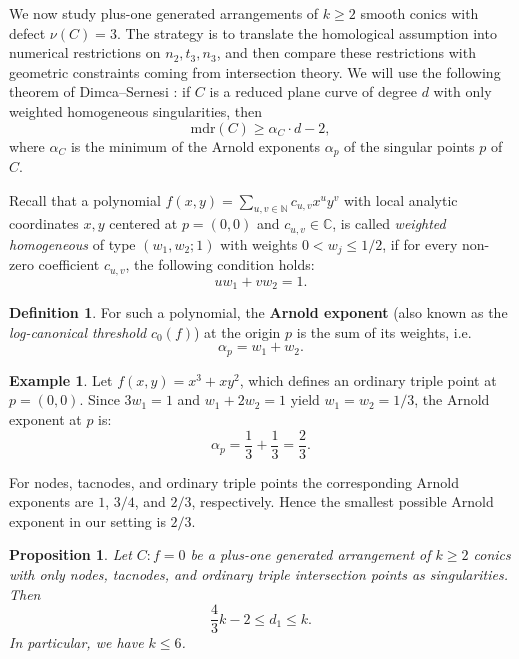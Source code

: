 \documentclass[11pt]{article}
\theoremstyle{plain}
\newtheorem{proposition}[thm]{Proposition}
\theoremstyle{definition}
\newtheorem{definition}[thm]{Definition}
\newtheorem{example}[thm]{Example}
\begin{document}
We now study plus-one generated arrangements of $k\geq2$ smooth conics with defect $\nu(C)=3$. The strategy is to translate the homological assumption into numerical restrictions on $n_2,t_3,n_3$, and then compare these restrictions with geometric constraints coming from intersection theory. 
\noindent
We will use the following theorem of Dimca--Sernesi \cite[Theorem 2.1]{Sernesi}: if $C$ is a reduced plane curve of degree $d$ with only weighted homogeneous singularities, then 
\begin{equation}\tag{$\triangle$}\label{eqtriangle}
    \text{mdr}(C)\geq\alpha_C\cdot d-2,
\end{equation}
where $\alpha_C$ is the minimum of the Arnold exponents $\alpha_p$ of the singular points $p$ of $C$. 

Recall that a polynomial $f(x,y)=\sum_{u,v\in\mathbb{N}}c_{u,v}x^uy^v$ with local analytic coordinates $x,y$ centered at $p=(0,0)$ and $c_{u,v}\in\mathbb{C}$, is called \textit{weighted homogeneous} of type $(w_1,w_2;1)$ with weights $0<w_j\leq1/2$, if for every non-zero coefficient $c_{u,v}$, the following condition holds:
$$uw_1+vw_2=1.$$

\begin{definition}
For such a polynomial, the \textbf{Arnold exponent} (also known as the \textit{log-canonical threshold} $c_0(f)$) at the origin $p$ is the sum of its weights, i.e.
$$\alpha_p=w_1+w_2.$$
\end{definition}

\begin{example}
    Let $f(x,y)=x^3+xy^2$, which defines an ordinary triple point at $p=(0,0)$. Since $3w_1=1$ and $w_1+2w_2=1$ yield $w_1=w_2=1/3$, the Arnold exponent at $p$ is: $$\alpha_p=\frac{1}{3}+\frac{1}{3}=\frac{2}{3}.$$
\end{example}

For nodes, tacnodes, and ordinary triple points the corresponding Arnold exponents are $1$, $3/4$, and $2/3$, respectively. Hence the smallest possible Arnold exponent in our setting is $2/3$.
        \begin{proposition} \label{prop:d1}
            Let $C: f=0$ be a plus-one generated arrangement of $k\geq 2$ conics with only nodes, tacnodes, and ordinary triple intersection points as singularities. Then
            $$\frac{4}{3}k-2 \leq d_1\leq k.$$
            In particular, we have $k\leq 6$.
        \end{proposition}
\end{document}
